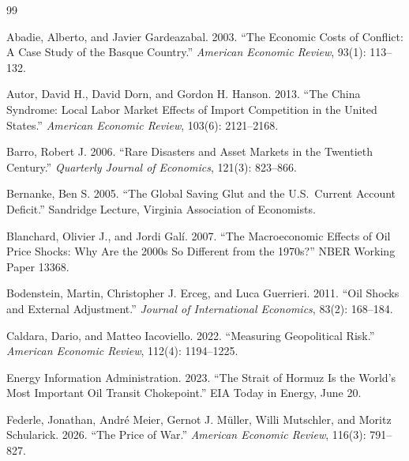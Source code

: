 \documentclass[12pt,a4paper]{article}
\begin{document}

\newpage


\begin{thebibliography}{99}

Abadie, Alberto, and Javier Gardeazabal. 2003. ``The Economic Costs of Conflict: A Case Study of the Basque Country.'' \textit{American Economic Review}, 93(1): 113--132.

Autor, David H., David Dorn, and Gordon H. Hanson. 2013. ``The China Syndrome: Local Labor Market Effects of Import Competition in the United States.'' \textit{American Economic Review}, 103(6): 2121--2168.

Barro, Robert J. 2006. ``Rare Disasters and Asset Markets in the Twentieth Century.'' \textit{Quarterly Journal of Economics}, 121(3): 823--866.

Bernanke, Ben S. 2005. ``The Global Saving Glut and the U.S.\ Current Account Deficit.'' Sandridge Lecture, Virginia Association of Economists.

Blanchard, Olivier J., and Jordi Gal\'{i}. 2007. ``The Macroeconomic Effects of Oil Price Shocks: Why Are the 2000s So Different from the 1970s?'' NBER Working Paper 13368.

Bodenstein, Martin, Christopher J. Erceg, and Luca Guerrieri. 2011. ``Oil Shocks and External Adjustment.'' \textit{Journal of International Economics}, 83(2): 168--184.

Caldara, Dario, and Matteo Iacoviello. 2022. ``Measuring Geopolitical Risk.'' \textit{American Economic Review}, 112(4): 1194--1225.

Energy Information Administration. 2023. ``The Strait of Hormuz Is the World's Most Important Oil Transit Chokepoint.'' EIA Today in Energy, June 20.

Federle, Jonathan, Andr\'{e} Meier, Gernot J. M\"{u}ller, Willi Mutschler, and Moritz Schularick. 2026. ``The Price of War.'' \textit{American Economic Review}, 116(3): 791--827.


\end{thebibliography}
\end{document}
